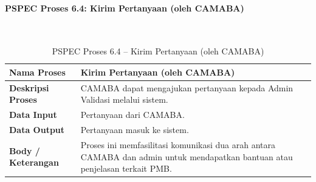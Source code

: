 \paragraph{PSPEC Proses 6.4: Kirim Pertanyaan (oleh CAMABA)}~\\
\begin{longtable}{|p{}|p{}|}
	\caption{PSPEC Proses 6.4 -- Kirim Pertanyaan (oleh CAMABA)}
	\label{table:3.pspec64}\\
	\hline
	\textbf{Nama Proses} & Kirim Pertanyaan (oleh CAMABA) \\
	\hline
	\textbf{Deskripsi Proses} & CAMABA dapat mengajukan pertanyaan kepada Admin Validasi melalui sistem. \\
	\hline
	\textbf{Data Input} & Pertanyaan dari CAMABA. \\
	\hline
	\textbf{Data Output} & Pertanyaan masuk ke sistem. \\
	\hline
	\textbf{Body / Keterangan} & Proses ini memfasilitasi komunikasi dua arah antara CAMABA dan admin untuk mendapatkan bantuan atau penjelasan terkait PMB. \\
	\hline
\end{longtable}


